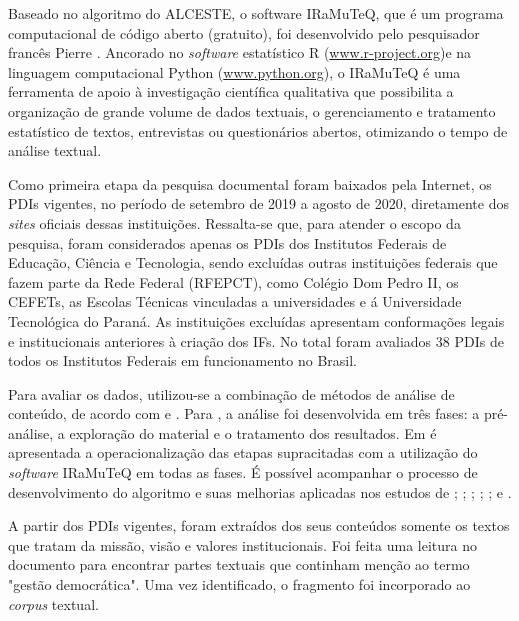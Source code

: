 \documentclass[portuguese]{textolivre}
\begin{document}
Baseado no algoritmo do ALCESTE, o software IRaMuTeQ, que é um programa computacional de código aberto (gratuito), foi desenvolvido pelo pesquisador francês Pierre \textcite{ratinaud_iramuteq_2014}. Ancorado no \textit{software} estatístico R (\url{www.r-project.org})e na linguagem computacional Python (\url{www.python.org}), o IRaMuTeQ é uma ferramenta de apoio à investigação científica qualitativa que possibilita a organização de grande volume de dados textuais, o gerenciamento e tratamento estatístico de textos, entrevistas ou questionários abertos, otimizando o tempo de análise textual.

Como primeira etapa da pesquisa documental foram baixados pela Internet, os PDIs vigentes, no período de setembro de 2019 a agosto de 2020, diretamente dos \textit{sites} oficiais dessas instituições. Ressalta-se que, para atender o escopo da pesquisa, foram considerados apenas os PDIs dos Institutos Federais de Educação, Ciência e Tecnologia, sendo excluídas outras instituições federais que fazem parte da Rede Federal (RFEPCT), como Colégio Dom Pedro II, os CEFETs, as Escolas Técnicas vinculadas a universidades e á Universidade Tecnológica do Paraná. As instituições excluídas apresentam conformações legais e institucionais anteriores à criação dos IFs. No total foram avaliados 38 PDIs de todos os Institutos Federais em funcionamento no Brasil.

Para avaliar os dados, utilizou-se a combinação de métodos de análise de conteúdo, de acordo com \textcite{bardini_alise_1977} e \textcite{silva_o_2021}. Para \textcite{bardini_alise_1977}, a análise foi desenvolvida em três fases: a pré-análise, a exploração do material e o tratamento dos resultados. Em \textcite{silva_o_2021} é apresentada a operacionalização das etapas supracitadas com a utilização do \textit{software} IRaMuTeQ em todas as fases. É possível acompanhar o processo de desenvolvimento do algoritmo e suas melhorias aplicadas nos estudos de  \textcite{bardini_alise_1977}; \textcite{leblanc_proposition_2016}; \textcite{oliveira_estudo_2003}; \textcite{marchand_quelques_2013}; \textcite{reinert_methode_1983, reinert_logiciel_1986}; \textcite{salem_segments_1986} e \textcite{pelissier_initiation_2017}.

A partir dos PDIs vigentes, foram extraídos dos seus conteúdos somente os textos que tratam da missão, visão e valores institucionais. Foi feita uma leitura no documento para encontrar partes textuais que continham menção ao termo "gestão democrática". Uma vez identificado, o fragmento foi incorporado ao \textit{corpus} textual.
\end{document}
